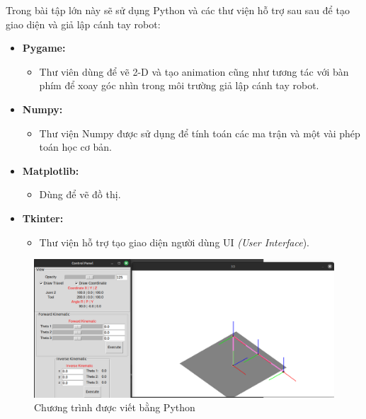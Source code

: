 Trong bài tập lớn này sẽ sử dụng Python và các thư viện hỗ trợ sau sau để tạo giao diện và giả lập cánh tay robot:
\begin{itemize}
    \item \textbf{Pygame:}
    \begin{itemize}
        \item Thư viên dùng để vẽ 2-D và tạo animation cũng như tương tác với bàn phím để xoay góc nhìn trong môi trường giả lập cánh tay robot.
    \end{itemize}
    \item \textbf{Numpy:}
    \begin{itemize}
        \item Thư viện Numpy được sử dụng để tính toán các ma trận và một vài phép toán học cơ bản.
    \end{itemize}
    \item \textbf{Matplotlib:}
    \begin{itemize}
        \item Dùng để vẽ đồ thị.
    \end{itemize}
    \item \textbf{Tkinter:}
    \begin{itemize}
        \item Thư viện hỗ trợ tạo giao diện người dùng UI \textit{(User Interface}).
    \end{itemize}
\end{itemize}
\begin{figure}[H]
	\centering
	\includegraphics[width=1\linewidth]{Images/software.png}
	\caption{Chương trình được viết bằng Python}
	\label{fig:enter-label1}
\end{figure}